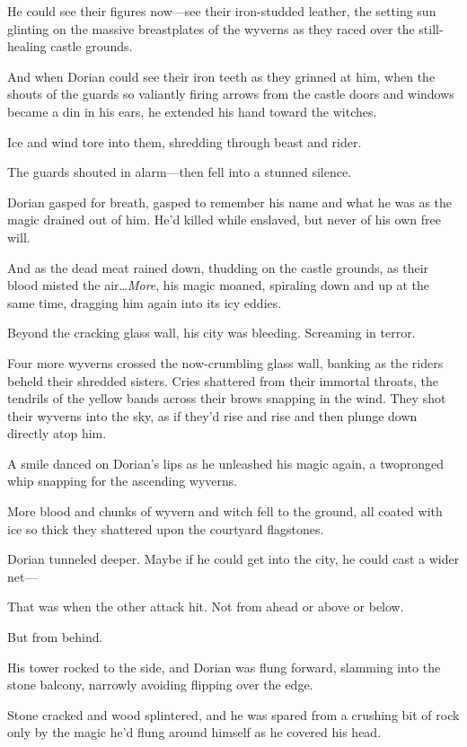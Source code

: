 He could see their figures now---see their iron-studded leather, the setting sun glinting on the massive breastplates of the wyverns as they raced over the still-healing castle grounds.

And when Dorian could see their iron teeth as they grinned at him, when the shouts of the guards so valiantly firing arrows from the castle doors and windows became a din in his ears, he extended his hand toward the witches.

Ice and wind tore into them, shredding through beast and rider.

The guards shouted in alarm---then fell into a stunned silence.

Dorian gasped for breath, gasped to remember his name and what he was as the magic drained out of him.
He'd killed while enslaved, but never of his own free will.

And as the dead meat rained down, thudding on the castle grounds, as their blood misted the air\ldots \emph{More}, his magic moaned, spiraling down and up at the same time, dragging him again into its icy eddies.

Beyond the cracking glass wall, his city was bleeding.
Screaming in terror.

Four more wyverns crossed the now-crumbling glass wall, banking as the riders beheld their shredded sisters.
Cries shattered from their immortal throats, the tendrils of the yellow bands across their brows snapping in the wind.
They shot their wyverns into the sky, as if they'd rise and rise and then plunge down directly atop him.

A smile danced on Dorian's lips as he unleashed his magic again, a twopronged whip snapping for the ascending wyverns.

More blood and chunks of wyvern and witch fell to the ground, all coated with ice so thick they shattered upon the courtyard flagstones.

Dorian tunneled deeper.
Maybe if he could get into the city, he could cast a wider net---

That was when the other attack hit.
Not from ahead or above or below.

But from behind.

His tower rocked to the side, and Dorian was flung forward, slamming into the stone balcony, narrowly avoiding flipping over the edge.

Stone cracked and wood splintered, and he was spared from a crushing bit of rock only by the magic he'd flung around himself as he covered his head.


